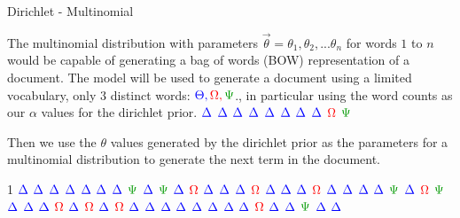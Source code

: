 \documentclass[
  ignorenonframetext,
]{beamer}
\begin{document}
\begin{frame}{Dirichlet - Multinomial}
\protect\hypertarget{dirichlet---multinomial}{}

\footnotesize

The multinomial distribution with parameters
\(\overrightarrow{\theta} = \theta_{1}, \theta_{2}, ... \theta_{n}\) for
words \(1\) to \(n\) would be capable of generating a bag of words (BOW)
representation of a document. The model will be used to generate a
document using a limited vocabulary, only 3 distinct words:
\(\color{blue} \Theta, \color{red} \Omega, \color{darkgreen} \Psi\)., in
particular using the word counts as our \(\alpha\) values for the
dirichlet prior. \(\color{blue} \Delta\) \(\color{blue} \Delta\)
\(\color{blue} \Delta\) \(\color{blue} \Delta\) \(\color{blue} \Delta\)
\(\color{blue} \Delta\) \(\color{blue} \Delta\) \(\color{blue} \Delta\)
\(\color{red} \Omega\) \(\color{darkgreen} \Psi\)

Then we use the \(\theta\) values generated by the dirichlet prior as
the parameters for a multinomial distribution to generate the next term
in the document.

1 \(\color{blue} \Delta\) \(\color{blue} \Delta\)
\(\color{blue} \Delta\) \(\color{blue} \Delta\) \(\color{blue} \Delta\)
\(\color{blue} \Delta\) \(\color{blue} \Delta\)
\(\color{darkgreen} \Psi\) \(\color{blue} \Delta\)
\(\color{darkgreen} \Psi\)  \(\color{blue} \Delta\)
\(\color{red} \Omega\) \(\color{blue} \Delta\) \(\color{blue} \Delta\)
\(\color{blue} \Delta\) \(\color{red} \Omega\) \(\color{blue} \Delta\)
\(\color{blue} \Delta\) \(\color{blue} \Delta\) \(\color{red} \Omega\)
 \(\color{blue} \Delta\) \(\color{blue} \Delta\)
\(\color{blue} \Delta\) \(\color{blue} \Delta\)
\(\color{darkgreen} \Psi\) \(\color{blue} \Delta\)
\(\color{red} \Omega\) \(\color{darkgreen} \Psi\)
\(\color{blue} \Delta\) \(\color{blue} \Delta\) 
\(\color{blue} \Delta\) \(\color{red} \Omega\) \(\color{blue} \Delta\)
\(\color{red} \Omega\) \(\color{blue} \Delta\) \(\color{red} \Omega\)
\(\color{blue} \Delta\) \(\color{blue} \Delta\) \(\color{blue} \Delta\)
\(\color{blue} \Delta\)  \(\color{blue} \Delta\)
\(\color{blue} \Delta\) \(\color{blue} \Delta\) \(\color{blue} \Delta\)
\(\color{red} \Omega\) \(\color{blue} \Delta\) \(\color{blue} \Delta\)
\(\color{darkgreen} \Psi\) \(\color{blue} \Delta\)
\(\color{blue} \Delta\) \newline

\end{frame}
\end{document}
